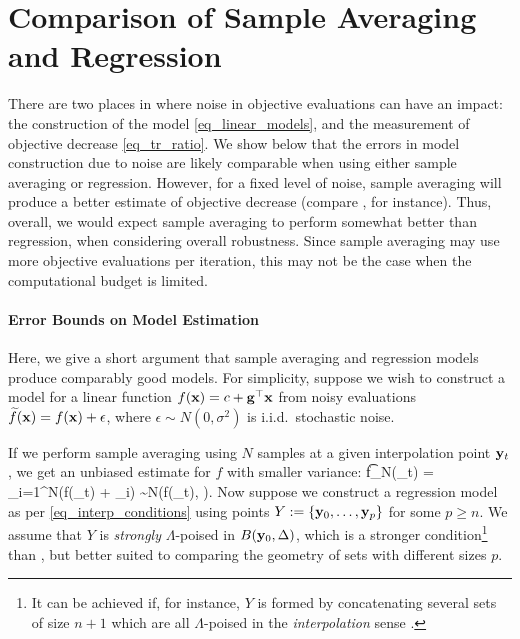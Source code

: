 \section{Comparison of Sample Averaging and Regression} \label{sec_regression_v_avg}
There are two places in  where noise in objective evaluations can have an impact: the construction of the model \eqref{eq_linear_models}, and the measurement of objective decrease \eqref{eq_tr_ratio}. 
We show below that the errors in model construction due to noise are likely comparable when using either sample averaging or regression.
However, for a fixed level of noise, sample averaging will produce a better estimate of objective decrease (compare \cite[Lemma 9.1]{Nocedal2006}, for instance).
Thus, overall, we would expect sample averaging to perform somewhat better than regression, when considering overall robustness. 
Since sample averaging may use more objective evaluations per iteration, this may not be the case when the computational budget is limited.

\paragraph{Error Bounds on Model Estimation}
Here, we give a short argument that sample averaging and regression models produce comparably good models.
For simplicity, suppose we wish to construct a model for a linear function $f(\mathbf{x})=c+\mathbf{g}^{\top}\mathbf{x}$ from noisy evaluations $\widetilde{f}(\mathbf{x})=f(\mathbf{x})+\epsilon$, where $\epsilon\sim N(0,\sigma^2)$ is i.i.d.~stochastic noise.

If we perform sample averaging using $N$ samples at a given interpolation point $\mathbf{y}_t$, we get an unbiased estimate for $f$ with smaller variance:
\be \t{f}_N(\by_t) = \sum_{i=1}^{N}(f(\by_t) + \epsilon_i) \sim N\left(f(\by_t), \right). \ee
Now suppose we construct a regression model as per \eqref{eq_interp_conditions} using points $Y:= \{\mathbf{y}_0,\ldots,\mathbf{y}_p\}$ for some $p\geq n$.
We assume that $Y$ is \emph{strongly} $\Lambda$-poised \cite[Definition 4.10]{Conn2009} in $B(\mathbf{y}_0,\Delta)$, which is a stronger condition\footnote{\:It can be achieved if, for instance, $Y$ is formed by concatenating several sets of size $n+1$ which are all $\Lambda$-poised in the \emph{interpolation} sense \cite[Definition 3.6]{Conn2009}.} than , but better suited to comparing the geometry of sets with different sizes $p$.

